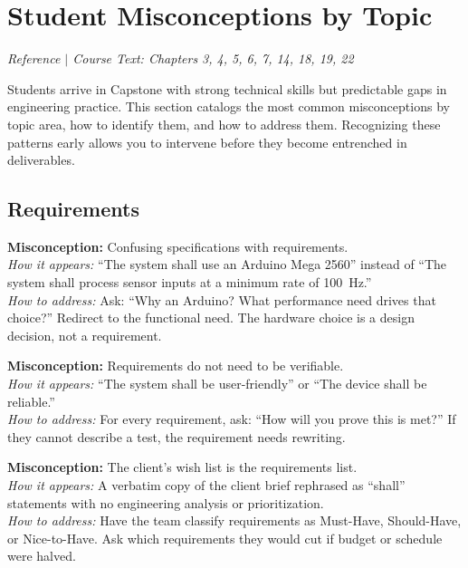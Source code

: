 \section{Student Misconceptions by Topic}
\textit{Reference $|$ Course Text: Chapters 3, 4, 5, 6, 7, 14, 18, 19, 22}

Students arrive in Capstone with strong technical skills but predictable gaps in engineering practice. This section catalogs the most common misconceptions by topic area, how to identify them, and how to address them. Recognizing these patterns early allows you to intervene before they become entrenched in deliverables.

\subsection{Requirements}

\begin{redflag}
\textbf{Misconception:} Confusing specifications with requirements.\\
\textit{How it appears:} ``The system shall use an Arduino Mega 2560'' instead of ``The system shall process sensor inputs at a minimum rate of 100~Hz.''\\
\textit{How to address:} Ask: ``Why an Arduino? What performance need drives that choice?'' Redirect to the functional need. The hardware choice is a design decision, not a requirement.
\end{redflag}

\begin{redflag}
\textbf{Misconception:} Requirements do not need to be verifiable.\\
\textit{How it appears:} ``The system shall be user-friendly'' or ``The device shall be reliable.''\\
\textit{How to address:} For every requirement, ask: ``How will you prove this is met?'' If they cannot describe a test, the requirement needs rewriting.
\end{redflag}

\begin{redflag}
\textbf{Misconception:} The client's wish list is the requirements list.\\
\textit{How it appears:} A verbatim copy of the client brief rephrased as ``shall'' statements with no engineering analysis or prioritization.\\
\textit{How to address:} Have the team classify requirements as Must-Have, Should-Have, or Nice-to-Have. Ask which requirements they would cut if budget or schedule were halved.
\end{redflag}

